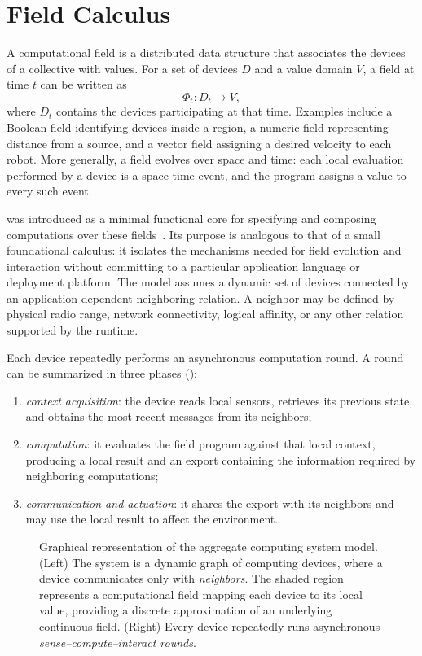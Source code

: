 \section{Field Calculus}
\label{sec:field-calculus}

A computational field is a distributed data structure that associates 
 the devices of a collective with values. 
% 
For a set of devices $D$ and a value domain $V$, 
 a field at time $t$ can be written as
\[
  \Phi_t : D_t \rightarrow V,
\]
 where $D_t$ contains the devices participating at that time. 
% 
Examples include a Boolean field identifying devices inside a region, 
 a numeric field representing distance from a source, 
 and a vector field assigning a desired velocity to each robot. 
% 
More generally, 
 a field evolves over space and time: 
 each local evaluation performed by a device is a space-time event, 
 and the program assigns a value to every such event.

 was introduced as a minimal functional core for specifying 
 and composing computations over these fields~\cite{DBLP:conf/esocc/ViroliDB13}. 
% 
Its purpose is analogous to that of a small foundational calculus: 
 it isolates the mechanisms needed for field evolution and interaction without committing 
 to a particular application language or deployment platform. 
% 
The model assumes a dynamic set of devices connected by an application-dependent 
 neighboring relation. 
% 
A neighbor may be defined by physical radio range, 
 network connectivity, logical affinity, or any other relation supported by the runtime.

Each device repeatedly performs an asynchronous computation round. 
%
A round can be summarized in three phases ():

\begin{enumerate}
  \item \emph{context acquisition}: the device reads local sensors, retrieves
  its previous state, and obtains the most recent messages from its neighbors;
  \item \emph{computation}: it evaluates the field program against that local
  context, producing a local result and an export containing the information
  required by neighboring computations;
  \item \emph{communication and actuation}: it shares the export with its
  neighbors and may use the local result to affect the environment.
\end{enumerate}

\begin{figure}[t]
    \centering
    \def\svgwidth{0.9\textwidth}
    {\scriptsize}
    \caption{
      Graphical representation of the aggregate computing system model.
(Left) The system is a dynamic graph of computing devices, where a device communicates only with \emph{neighbors}.
The shaded region represents a computational field mapping each device to its local value, providing a discrete approximation of an underlying continuous field.
(Right) Every device repeatedly runs asynchronous \emph{sense--compute--interact rounds}.
    }
    \label{fig:ac-model}
\end{figure}

